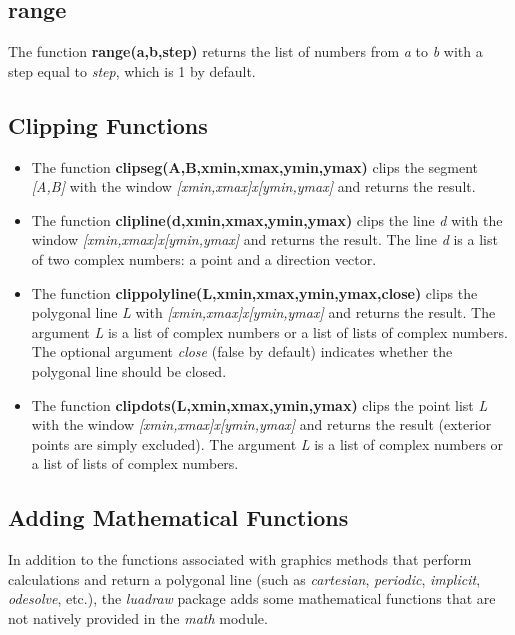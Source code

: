 \subsection{range}
The function \textbf{range(a,b,step)} returns the list of numbers from \emph{a} to \emph{b} with a step equal to \emph{step}, which is 1 by default.

\subsection{Clipping Functions}

\begin{itemize}
    \item The function \textbf{clipseg(A,B,xmin,xmax,ymin,ymax)} clips the segment \emph{{[}A,B{]}} with the window \emph{{[}xmin,xmax{]}x{[}ymin,ymax{]}} and returns the result.
    \item The function \textbf{clipline(d,xmin,xmax,ymin,ymax)} clips the line \emph{d} with the window \emph{{[}xmin,xmax{]}x{[}ymin,ymax{]}} and returns the result. The line \emph{d} is a list of two complex numbers: a point and a direction vector.
    \item The function \textbf{clippolyline(L,xmin,xmax,ymin,ymax,close)} clips the polygonal line \emph{L} with \emph{{[}xmin,xmax{]}x{[}ymin,ymax{]}} and returns the result. The argument \emph{L} is a list of complex numbers or a list of lists of complex numbers. The optional argument \emph{close} (false by default) indicates whether the polygonal line should be closed.
    \item The function \textbf{clipdots(L,xmin,xmax,ymin,ymax)} clips the point list \emph{L} with the window \emph{{[}xmin,xmax{]}x{[}ymin,ymax{]}} and returns the result (exterior points are simply excluded). The argument \emph{L} is a list of complex numbers or a list of lists of complex numbers.
\end{itemize}

\subsection{Adding Mathematical Functions}
In addition to the functions associated with graphics methods that perform calculations and return a polygonal line (such as \emph{cartesian}, \emph{periodic}, \emph{implicit}, \emph{odesolve}, etc.), the \emph{luadraw} package adds some mathematical functions that are not natively provided in the \emph{math} module.


